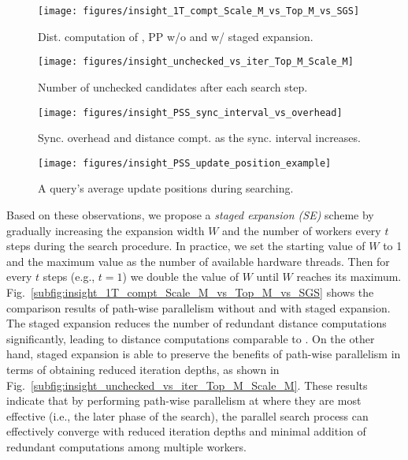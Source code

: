 \begin{figure}[t]
\begin{minipage}[t]{0.23\textwidth}
    \centering
    \texttt{[image: figures/insight\_1T\_compt\_Scale\_M\_vs\_Top\_M\_vs\_SGS]}
    \caption{Dist. computation of \SeqShortName, PP w/o and w/ staged expansion.}
    \label{subfig:insight_1T_compt_Scale_M_vs_Top_M_vs_SGS}
\end{minipage}
\hfill
\begin{minipage}[t]{0.23\textwidth}
    \centering
    \texttt{[image: figures/insight\_unchecked\_vs\_iter\_Top\_M\_Scale\_M]}
    \caption{Number of unchecked candidates after each search step. }
    \label{subfig:insight_unchecked_vs_iter_Top_M_Scale_M}
\end{minipage}
\hfill
    \begin{minipage}[t]{0.23\textwidth}
        \centering
        \texttt{[image: figures/insight\_PSS\_sync\_interval\_vs\_overhead]}
        \caption{
            {Sync. overhead and distance compt. as the sync. interval increases.}}
        \label{fig:insight_PSS_sync_interval_vs_overhead}
    \end{minipage}
    \hfill
    \begin{minipage}[t]{0.23\textwidth}
        \centering
        \texttt{[image: figures/insight\_PSS\_update\_position\_example]}
        \caption{A query's average update positions during searching.
        }
        \label{fig:insight_PSS_update_position_example}
    \end{minipage}
\end{figure}

Based on these observations, we propose a \emph{staged expansion (SE)} scheme by gradually increasing the expansion width $W$ and the number of workers every $t$ steps during the search procedure. In practice, we set the starting value of $W$ to 1 and the maximum value as the number of available hardware threads. Then for every $t$ steps (e.g., $t=1$) we double the value of $W$ until $W$ reaches its maximum. Fig.~\ref{subfig:insight_1T_compt_Scale_M_vs_Top_M_vs_SGS} shows the comparison results of path-wise parallelism without and with staged expansion. The staged expansion reduces the number of redundant distance computations significantly, leading to distance computations comparable to \SeqShortName. On the other hand, staged expansion is able to preserve the benefits of path-wise parallelism in terms of obtaining reduced iteration depths, as shown in Fig.~\ref{subfig:insight_unchecked_vs_iter_Top_M_Scale_M}. These results indicate that by performing path-wise parallelism at where they are most effective (i.e., the later phase of the search), the parallel search process can effectively converge with reduced iteration depths and minimal addition of redundant computations among multiple workers.

